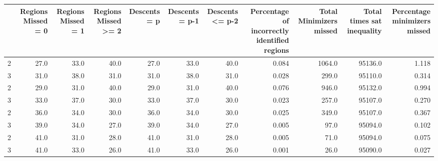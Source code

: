 \begin{tabular}{lrrrrrrrrrr}
\toprule
{} &  Regions Missed = 0 &  Regions Missed = 1 &  Regions Missed >= 2 &  Descents = p &  Descents = p-1 &  Descents <= p-2 &  Percentage of incorrectly identified regions &  Total Minimizers missed &  Total times sat inequality &  Percentage minimizers missed \\
\midrule
2 &                27.0 &                33.0 &                 40.0 &          27.0 &            33.0 &             40.0 &                                         0.084 &                   1064.0 &                     95136.0 &                         1.118 \\
3 &                31.0 &                38.0 &                 31.0 &          31.0 &            38.0 &             31.0 &                                         0.028 &                    299.0 &                     95110.0 &                         0.314 \\
2 &                29.0 &                31.0 &                 40.0 &          29.0 &            31.0 &             40.0 &                                         0.076 &                    946.0 &                     95132.0 &                         0.994 \\
3 &                33.0 &                37.0 &                 30.0 &          33.0 &            37.0 &             30.0 &                                         0.023 &                    257.0 &                     95107.0 &                         0.270 \\
2 &                36.0 &                34.0 &                 30.0 &          36.0 &            34.0 &             30.0 &                                         0.025 &                    349.0 &                     95107.0 &                         0.367 \\
3 &                39.0 &                34.0 &                 27.0 &          39.0 &            34.0 &             27.0 &                                         0.005 &                     97.0 &                     95094.0 &                         0.102 \\
2 &                41.0 &                31.0 &                 28.0 &          41.0 &            31.0 &             28.0 &                                         0.005 &                     71.0 &                     95094.0 &                         0.075 \\
3 &                41.0 &                33.0 &                 26.0 &          41.0 &            33.0 &             26.0 &                                         0.001 &                     26.0 &                     95090.0 &                         0.027 \\
\bottomrule
\end{tabular}
